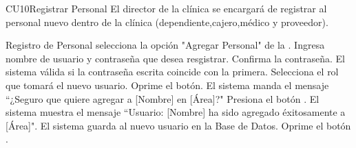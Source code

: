 
% 



	\begin{UseCase}{CU10}{Registrar Personal}{
		El director de la clínica se encargará de registrar al personal nuevo dentro de la clínica (dependiente,cajero,médico y proveedor).
	}
	\end{UseCase}

	\begin{UCtrayectoria}{Registro de Personal}
	\UCpaso[\UCactor] selecciona la opci\'on "Agregar Personal"  de la  \label{CU10RegistroPersonal}.
		\UCpaso[\UCactor] Ingresa nombre de usuario y contraseña que desea resgistrar. 
		\UCpaso[\UCactor] Confirma la contraseña.
		\UCpaso El sistema válida si la contraseña escrita coincide con la primera.
		\UCpaso[\UCactor]Selecciona el rol que tomará el nuevo usuario.
		\UCpaso[\UCactor] Oprime el botón.
		\UCpaso El sistema manda el mensaje ``¿Seguro que quiere agregar a [Nombre] en [Área]?"
		\UCpaso[\UCactor] Presiona el botón .
		\UCpaso El sistema muestra el mensaje ``Usuario: [Nombre] ha sido agregado éxitosamente a [Área]".
		\UCpaso El sistema guarda al nuevo usuario en la Base de Datos. 
		\UCpaso[\UCactor]Oprime el botón .
	\end{UCtrayectoria}
		
